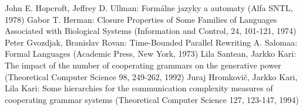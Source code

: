 \begin{thebibliography}{99}
 John E. Hopcroft, Jeffrey D. Ullman: Formálne jazyky
a automaty (Alfa SNTL, 1978)
 Gabor T. Herman: Closure Properties of Some
Families of Languages Associated with Biological Systems
(Information and Control, 24, 101-121, 1974)
 Peter Gvozdjak, Branislav Rovan: Time-Bounded
Parallel Rewriting
 A. Salomaa: Formal Languages
(Academic Press, New York, 1973)
 Lila Santean, Jarkko Kari: The impact of the
number of cooperating grammars on the generative power
(Theoretical Computer Science 98, 249-262, 1992)
 Juraj Hromkovič, Jarkko Kari, Lila Kari: Some
hierarchies for the communication complexity measures of
cooperating grammar systems (Theoretical Computer Science 127,
123-147, 1994)
\end{thebibliography}
